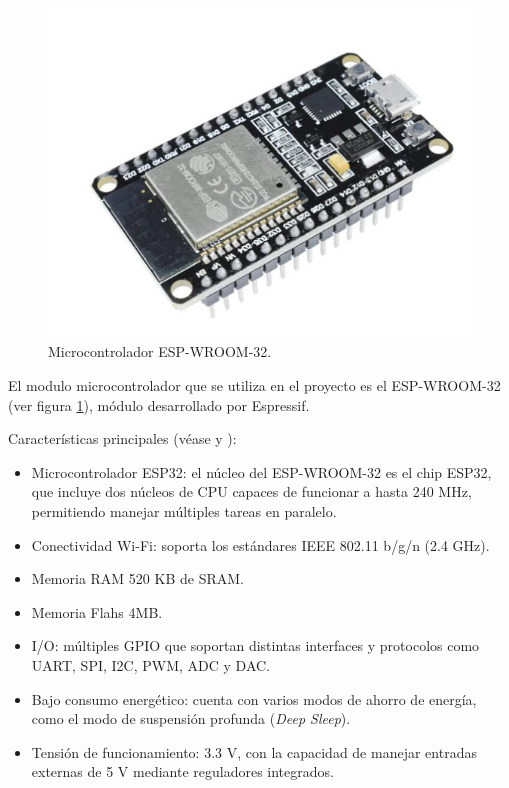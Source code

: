 \label{sec:Microcontrolador}
\begin{figure}[H]
	\centering
	\includegraphics[scale=1]{./Figures/Hardware/Modulos/esp32.png}
	\caption{Microcontrolador ESP-WROOM-32.}
	\label{fig:Microcontrolador}
\end{figure}

El modulo microcontrolador que se utiliza en el proyecto es el ESP-WROOM-32 (ver figura \ref{fig:Microcontrolador}), módulo desarrollado por Espressif.

Características principales (véase \cite{Esp32Datasheet} y \cite{Esp32WroomDatasheet}):
\begin{itemize}
    \item Microcontrolador ESP32: el núcleo del ESP-WROOM-32 es el chip ESP32, que incluye dos núcleos de CPU capaces de funcionar a hasta 240 MHz, permitiendo manejar múltiples tareas en paralelo.
    \item Conectividad Wi-Fi: soporta los estándares IEEE 802.11 b/g/n (2.4 GHz).
    \item Memoria RAM 520 KB de SRAM.
    \item Memoria Flahs 4MB.
    \item I/O: múltiples GPIO que soportan distintas interfaces y protocolos como UART, SPI, I2C, PWM, ADC y DAC.
    \item Bajo consumo energético: cuenta con varios modos de ahorro de energía, como el modo de suspensión profunda (\textit{Deep Sleep}).
    \item Tensión de funcionamiento: 3.3 V, con la capacidad de manejar entradas externas de 5 V mediante reguladores integrados.
\end{itemize}

